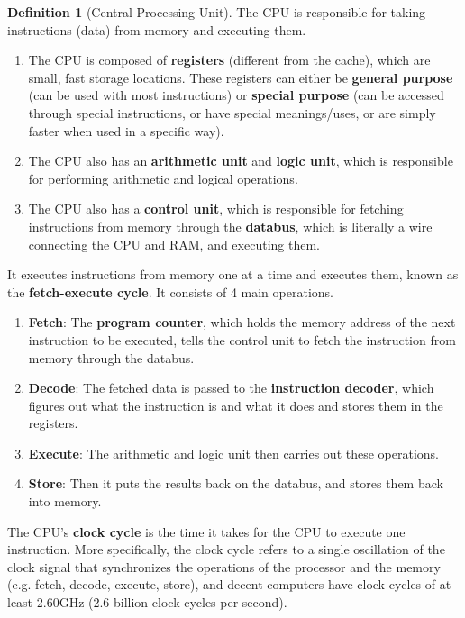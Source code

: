 \documentclass{article}
\theoremstyle{definition}
\newtheorem{definition}{Definition}[section]
\begin{document}
    \begin{definition}[Central Processing Unit]
      The CPU is responsible for taking instructions (data) from memory and executing them. 
      \begin{enumerate} 
        \item The CPU is composed of \textbf{registers} (different from the cache), which are small, fast storage locations. These registers can either be \textbf{general purpose} (can be used with most instructions) or \textbf{special purpose} (can be accessed through special instructions, or have special meanings/uses, or are simply faster when used in a specific way).
        \item The CPU also has an \textbf{arithmetic unit} and \textbf{logic unit}, which is responsible for performing arithmetic and logical operations. 
        \item The CPU also has a \textbf{control unit}, which is responsible for fetching instructions from memory through the \textbf{databus}, which is literally a wire connecting the CPU and RAM, and executing them. 
      \end{enumerate}
      It executes instructions from memory one at a time and executes them, known as the \textbf{fetch-execute cycle}. It consists of 4 main operations. 
      \begin{enumerate} 
        \item \textbf{Fetch}: The \textbf{program counter}, which holds the memory address of the next instruction to be executed, tells the control unit to fetch the instruction from memory through the databus. 
        \item \textbf{Decode}: The fetched data is passed to the \textbf{instruction decoder}, which figures out what the instruction is and what it does and stores them in the registers.
        \item \textbf{Execute}: The arithmetic and logic unit then carries out these operations. 
        \item \textbf{Store}: Then it puts the results back on the databus, and stores them back into memory.
      \end{enumerate} 
      The CPU's \textbf{clock cycle} is the time it takes for the CPU to execute one instruction. More specifically, the clock cycle refers to a single oscillation of the clock signal that synchronizes the operations of the processor and the memory (e.g. fetch, decode, execute, store), and decent computers have clock cycles of at least $2.60$GHz (2.6 billion clock cycles per second). 
    \end{definition}
\end{document}
